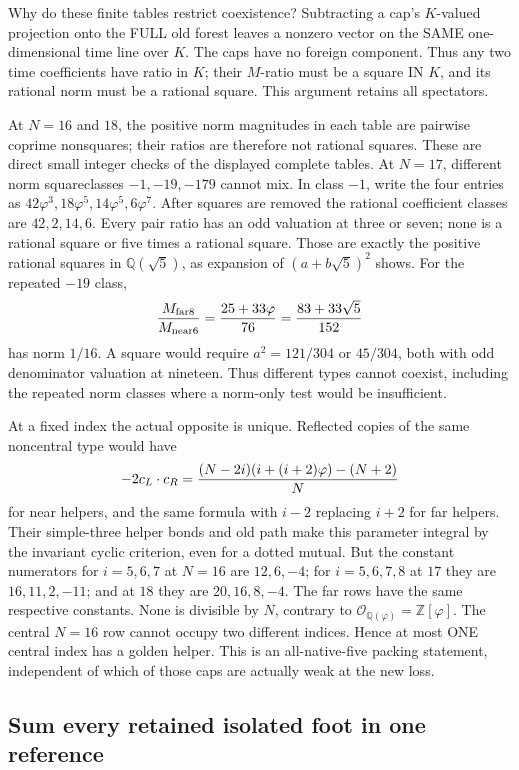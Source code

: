 \documentclass[11pt]{article}
\begin{document}
Why do these finite tables restrict coexistence?
Subtracting a cap's \(K\)-valued projection onto the FULL old
forest leaves a nonzero vector on the SAME one-dimensional
time line over \(K\).
The caps have no foreign component.
Thus any two time coefficients have ratio in \(K\);
their \(M\)-ratio must be a square IN \(K\), and its rational
norm must be a rational square.
This argument retains all spectators.

At \(N=16\) and \(18\), the positive norm magnitudes in each
table are pairwise coprime nonsquares; their ratios are therefore
not rational squares.  These are direct small integer checks of
the displayed complete tables.
At \(N=17\), different norm squareclasses \(-1,-19,-179\)
cannot mix.
In class \(-1\), write the four entries as
\(42\varphi^3,18\varphi^5,14\varphi^5,6\varphi^7\).
After squares are removed the rational coefficient classes are
\(42,2,14,6\).
Every pair ratio has an odd valuation at three or seven;
none is a rational square or five times a rational square.
Those are exactly the positive rational squares in
\(\mathbb Q(\sqrt5)\), as expansion of
\((a+b\sqrt5)^2\) shows.
For the repeated \(-19\) class,
\[
 {M_{\rm far8}\over M_{\rm near6}}
   ={25+33\varphi\over76}={83+33\sqrt5\over152}
\]
has norm \(1/16\).
A square would require
\(a^2=121/304\) or \(45/304\), both with odd denominator
valuation at nineteen.
Thus different types cannot coexist, including the repeated
norm classes where a norm-only test would be insufficient.

At a fixed index the actual opposite is unique.
Reflected copies of the same noncentral type would have
\[
 -2c_L\cdot c_R=
 { (N-2i)(i+(i+2)\varphi)-(N+2)\over N}
\]
for near helpers, and the same formula with \(i-2\) replacing
\(i+2\) for far helpers.
Their simple-three helper bonds and old path make this
parameter integral by the invariant cyclic criterion, even for
a dotted mutual.
But the constant numerators for \(i=5,6,7\) at \(N=16\) are
\(12,6,-4\); for \(i=5,6,7,8\) at \(17\) they are
\(16,11,2,-11\); and at \(18\) they are \(20,16,8,-4\).
The far rows have the same respective constants.
None is divisible by \(N\), contrary to
\(\mathcal O_{\mathbb Q(\varphi)}=\mathbb Z[\varphi]\).
The central \(N=16\) row cannot occupy two different indices.
Hence at most ONE central index has a golden helper.
This is an all-native-five packing statement, independent of
which of those caps are actually weak at the new loss.

\subsection{Sum every retained isolated foot in one reference}
\label{app:arithsummedfeet}
\end{document}
